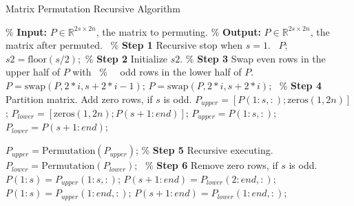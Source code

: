\documentclass{book}
\theoremstyle{remark}
\begin{document}
\begin{algorithm}[htbp]
    \caption{Matrix Permutation Recursive Algorithm} \label{alg:Permutation}
    \begin{algorithmic}[1]
        \State \% \textbf{Input:} $P \in \mathbb{R}^{2s \times 2n}$, the matrix to permuting.
        \State \% \textbf{Output:} $P \in \mathbb{R}^{2s \times 2n}$, the matrix after permuted.
         \qquad\qquad\qquad\qquad\qquad\qquad\qquad\qquad \ \% \textbf{Step 1} Recursive stop when $s=1$.
            \State \Return \ $P$;
        \End 
        \State $s2 = \text{floor}(s/2)$;\qquad\qquad\qquad\qquad\qquad\qquad\quad \ \% \textbf{Step 2} Initialize $s2$.
         \qquad\qquad\qquad\qquad\qquad\qquad\qquad\% \textbf{Step 3} Swap even rows in the upper half of $P$ with
             \qquad\qquad\qquad\qquad\qquad\quad \ \% \qquad\quad\ \  odd rows in the lower half of $P$.
                \State $P= \text{swap}(P,2*i,s+2*i-1)$;
            \Else
                \State $P= \text{swap}(P,2*i,s+2*i)$;
            \End
        \End
         \qquad\qquad\qquad\qquad\qquad\qquad\ \% \textbf{Step 4} Partition matrix. Add zero rows, if $s$ is odd.
            \State $P_{upper} = [P(1:s,:); \text{zeros}(1, 2n)]$;
            \State $P_{lower} = [\text{zeros}(1, 2n); P(s+1:end)]$;
        \Else
            \State $P_{upper} = P(1:s,:)$;
            \State $P_{lower} = P(s+1:end)$;
        \End
        
        \State $P_{upper} = \text{Permutation}(P_{upper})$; \qquad\qquad\qquad\% \textbf{Step 5} Recursive executing.
        \State $P_{lower} = \text{Permutation}(P_{lower})$;
         \qquad\qquad\qquad\qquad\qquad\qquad\ \% \textbf{Step 6} Remove zero rows, if $s$ is odd.
            \State $P(1:s) = P_{upper}(1:s, :)$;
            \State $P(s+1:end) = P_{lower}(2:end, :)$;
        \Else
            \State $P(1:s) = P_{upper}(1:end, :)$;
            \State $P(s+1:end) = P_{lower}(1:end, :)$;
        \End
    \End 
    \end{algorithmic}
\end{algorithm}
\end{document}
